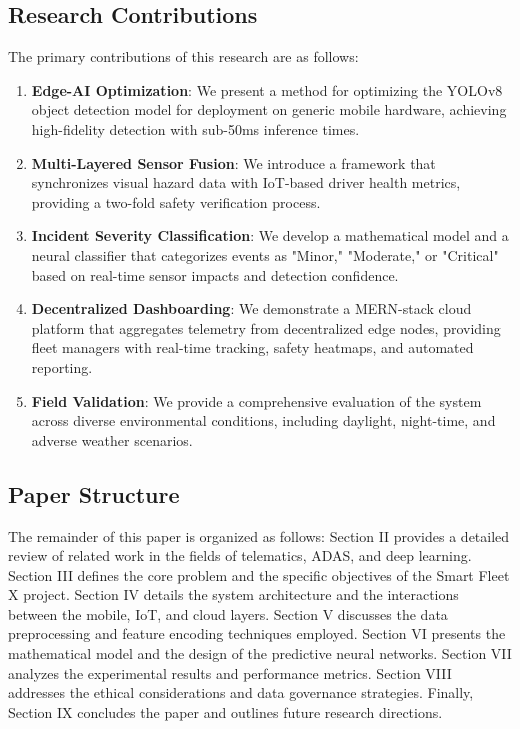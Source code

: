 \documentclass[conference]{IEEEtran}
\begin{document}
\subsection{Research Contributions}
The primary contributions of this research are as follows:
\begin{enumerate}
    \item \textbf{Edge-AI Optimization}: We present a method for optimizing the YOLOv8 object detection model for deployment on generic mobile hardware, achieving high-fidelity detection with sub-50ms inference times.
    \item \textbf{Multi-Layered Sensor Fusion}: We introduce a framework that synchronizes visual hazard data with IoT-based driver health metrics, providing a two-fold safety verification process.
    \item \textbf{Incident Severity Classification}: We develop a mathematical model and a neural classifier that categorizes events as "Minor," "Moderate," or "Critical" based on real-time sensor impacts and detection confidence.
    \item \textbf{Decentralized Dashboarding}: We demonstrate a MERN-stack cloud platform that aggregates telemetry from decentralized edge nodes, providing fleet managers with real-time tracking, safety heatmaps, and automated reporting.
    \item \textbf{Field Validation}: We provide a comprehensive evaluation of the system across diverse environmental conditions, including daylight, night-time, and adverse weather scenarios.
\end{enumerate}

\subsection{Paper Structure}
The remainder of this paper is organized as follows: Section II provides a detailed review of related work in the fields of telematics, ADAS, and deep learning. Section III defines the core problem and the specific objectives of the Smart Fleet X project. Section IV details the system architecture and the interactions between the mobile, IoT, and cloud layers. Section V discusses the data preprocessing and feature encoding techniques employed. Section VI presents the mathematical model and the design of the predictive neural networks. Section VII analyzes the experimental results and performance metrics. Section VIII addresses the ethical considerations and data governance strategies. Finally, Section IX concludes the paper and outlines future research directions.
\end{document}
